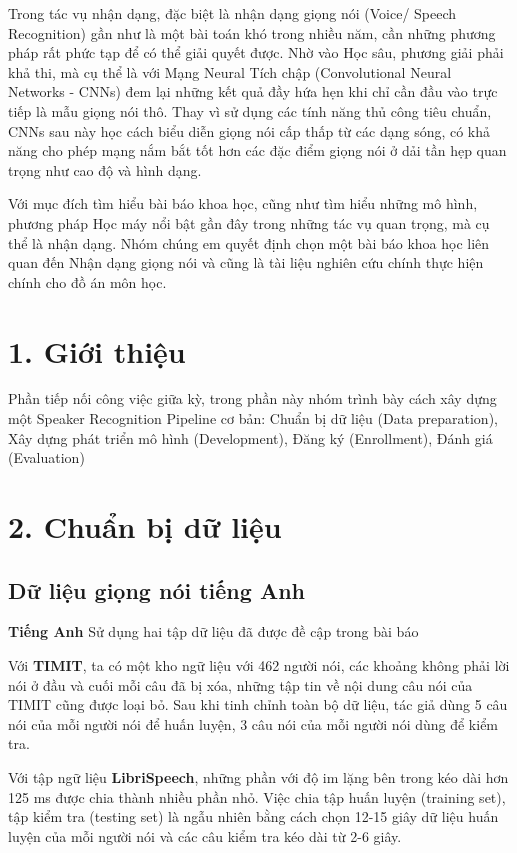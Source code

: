 \documentclass{article}
\begin{document}
	Trong tác vụ nhận dạng, đặc biệt là nhận dạng giọng nói (Voice/ Speech Recognition) gần như là một bài toán khó trong nhiều năm, cần những phương pháp rất phức tạp để có thể giải quyết được. Nhờ vào Học sâu, phương giải phải khả thi, mà cụ thể là với Mạng Neural Tích chập (Convolutional Neural Networks - CNNs) đem lại những kết quả đầy hứa hẹn khi chỉ cần đầu vào trực tiếp là mẫu giọng nói thô. Thay vì sử dụng các tính năng thủ công tiêu chuẩn, CNNs sau này học cách biểu diễn giọng nói cấp thấp từ các dạng sóng, có khả năng cho phép mạng nắm bắt tốt hơn các đặc điểm giọng nói ở dải tần hẹp quan trọng như cao độ và hình dạng.
	
	Với mục đích tìm hiểu bài báo khoa học, cũng như tìm hiểu những mô hình, phương pháp Học máy nổi bật gần đây trong những tác vụ quan trọng, mà cụ thể là nhận dạng. Nhóm chúng em quyết định chọn một bài báo khoa học liên quan đến Nhận dạng giọng nói và cũng là tài liệu nghiên cứu chính thực hiện chính cho đồ án môn học.
	
	\section{1. Giới thiệu}
	\qquad Phần tiếp nối công việc giữa kỳ, trong phần này nhóm trình bày cách xây dựng một Speaker Recognition Pipeline cơ bản: Chuẩn bị dữ liệu (Data preparation), Xây dựng phát triển mô hình (Development), Đăng ký (Enrollment), Đánh giá (Evaluation)
	
	\section{2. Chuẩn bị dữ liệu}
	\subsection{Dữ liệu giọng nói tiếng Anh}
	\qquad \textbf{Tiếng Anh} Sử dụng hai tập dữ liệu đã được đề cập trong bài báo
	
	Với \textbf{TIMIT}, ta có một kho ngữ liệu với 462 người nói, các khoảng không phải lời nói ở đầu và cuối mỗi câu đã bị xóa, những tập tin về nội dung câu nói của TIMIT cũng được loại bỏ. Sau khi tinh chỉnh toàn bộ dữ liệu, tác giả dùng 5 câu nói của mỗi người nói để huấn luyện, 3 câu nói của mỗi người nói dùng để kiểm tra.
	
	Với tập ngữ liệu \textbf{LibriSpeech}, những phần với độ im lặng bên trong kéo dài hơn 125 ms được chia thành nhiều phần nhỏ. Việc chia tập huấn luyện (training set), tập kiểm tra (testing set) là ngẫu nhiên bằng cách chọn 12-15 giây dữ liệu huấn luyện của mỗi người nói và các câu kiểm tra kéo dài từ 2-6 giây. 
\end{document}
